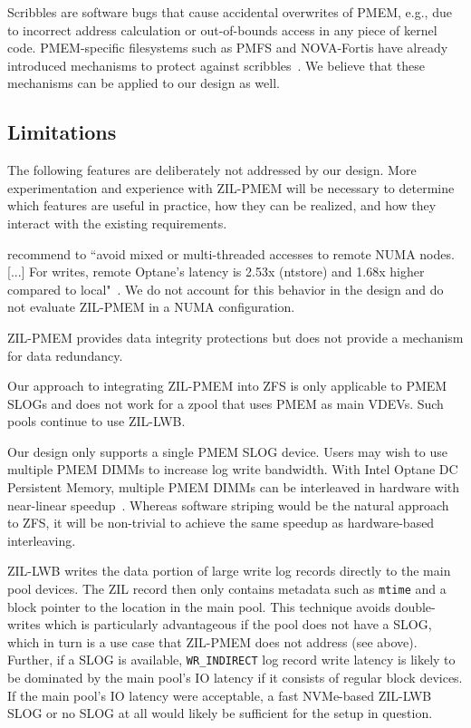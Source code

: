 \documentclass[12pt,a4paper,twoside]{book}
\begin{document}
{
Scribbles are software bugs that cause accidental overwrites of PMEM, e.g., due to incorrect address calculation or out-of-bounds access in any piece of kernel code.
PMEM-specific filesystems such as PMFS and NOVA-Fortis have already introduced mechanisms to protect against scribbles~\cite{dulloorSystemSoftwarePersistent2014,xuNOVAFortisFaulttolerantNonvolatile2017}.
We believe that these mechanisms can be applied to our design as well.

\subsection{Limitations}
The following features are deliberately not addressed by our design.
More experimentation and experience with ZIL-PMEM will be necessary to determine which features are useful in practice, how they can be realized, and how they interact with the existing requirements.

\citeauthor{yangEmpiricalGuideBehavior2020} recommend to ``avoid mixed or multi-threaded accesses to remote NUMA nodes. [...]  For writes, remote Optane’s latency is 2.53x (ntstore) and 1.68x higher compared to local"~\cite{yangEmpiricalGuideBehavior2020}.
We do not account for this behavior in the design and do not evaluate ZIL-PMEM in a NUMA configuration.

ZIL-PMEM provides data integrity protections but does not provide a mechanism for data redundancy.

Our approach to integrating ZIL-PMEM into ZFS is only applicable to PMEM SLOGs and does not work for a zpool that uses PMEM as main VDEVs.
Such pools continue to use ZIL-LWB.

Our design only supports a single PMEM SLOG device.
Users may wish to use multiple PMEM DIMMs to increase log write bandwidth.
With Intel Optane DC Persistent Memory, multiple PMEM DIMMs can be interleaved in hardware with near-linear speedup~\cite{yangEmpiricalGuideBehavior2020}.
Whereas software striping would be the natural approach to ZFS, it will be non-trivial to achieve the same speedup as hardware-based interleaving.

ZIL-LWB writes the data portion of large write log records directly to the main pool devices.
The ZIL record then only contains metadata such as \lstinline{mtime} and a block pointer to the location in the main pool.
This technique avoids double-writes which is particularly advantageous if the pool does not have a SLOG, which in turn is a use case that ZIL-PMEM does not address (see above).
Further, if a SLOG is available, \lstinline{WR_INDIRECT} log record write latency is likely to be dominated by the main pool's IO latency if it consists of regular block devices.
If the main pool's IO latency were acceptable, a fast NVMe-based ZIL-LWB SLOG or no SLOG at all would likely be sufficient for the setup in question.

}
\end{document}
